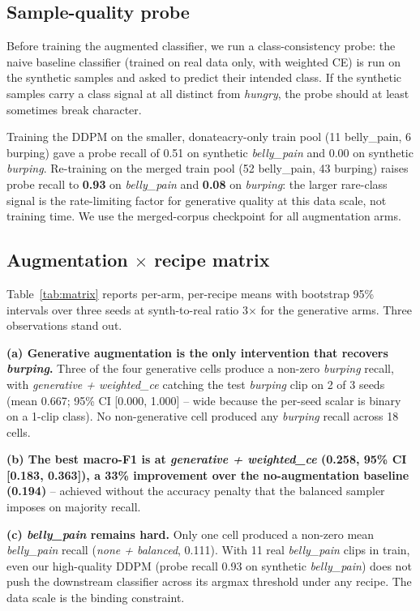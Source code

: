 \documentclass[final]{article}
\begin{document}
\subsection{Sample-quality probe}\label{sec:probe}
Before training the augmented classifier, we run a class-consistency probe: the naive baseline classifier (trained on real data only, with weighted CE) is run on the synthetic samples and asked to predict their intended class. If the synthetic samples carry a class signal at all distinct from \textit{hungry}, the probe should at least sometimes break character.

Training the DDPM on the smaller, donateacry-only train pool (11 belly\_pain, 6 burping) gave a probe recall of 0.51 on synthetic \textit{belly\_pain} and 0.00 on synthetic \textit{burping}. Re-training on the merged train pool (52 belly\_pain, 43 burping) raises probe recall to \textbf{0.93} on \textit{belly\_pain} and \textbf{0.08} on \textit{burping}: the larger rare-class signal is the rate-limiting factor for generative quality at this data scale, not training time. We use the merged-corpus checkpoint for all augmentation arms.

\subsection{Augmentation $\times$ recipe matrix}\label{sec:matrix}
Table~\ref{tab:matrix} reports per-arm, per-recipe means with bootstrap 95\% intervals over three seeds at synth-to-real ratio 3$\times$ for the generative arms. Three observations stand out.

\textbf{(a) Generative augmentation is the only intervention that recovers \textit{burping}.} Three of the four generative cells produce a non-zero \textit{burping} recall, with \textit{generative + weighted\_ce} catching the test \textit{burping} clip on 2 of 3 seeds (mean 0.667; 95\% CI [0.000, 1.000] -- wide because the per-seed scalar is binary on a 1-clip class). No non-generative cell produced any \textit{burping} recall across 18 cells.

\textbf{(b) The best macro-F1 is at \textit{generative + weighted\_ce} (0.258, 95\% CI [0.183, 0.363]), a 33\% improvement over the no-augmentation baseline (0.194)} -- achieved without the accuracy penalty that the balanced sampler imposes on majority recall.

\textbf{(c) \textit{belly\_pain} remains hard.} Only one cell produced a non-zero mean \textit{belly\_pain} recall (\textit{none + balanced}, 0.111). With 11 real \textit{belly\_pain} clips in train, even our high-quality DDPM (probe recall 0.93 on synthetic \textit{belly\_pain}) does not push the downstream classifier across its argmax threshold under any recipe. The data scale is the binding constraint.
\end{document}
